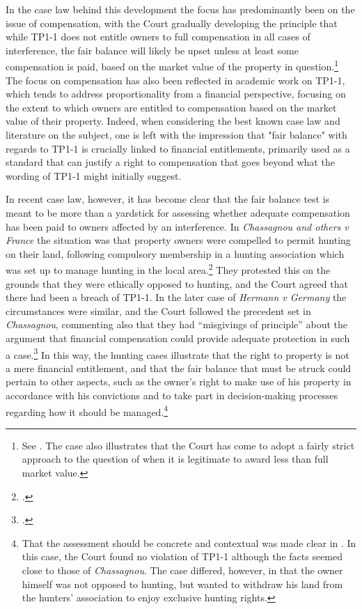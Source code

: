 In the case law behind this development the focus has predominantly been on the issue of compensation, with the Court gradually developing the principle that while TP1-1 does not entitle owners to full compensation in all cases of interference, the fair balance will likely be upset unless at least some compensation is paid, based on the market value of the property in question.\footnote{See \cite[103]{scordino06}. The case also illustrates that the Court has come to adopt a fairly strict approach to the question of when it is legitimate to award less than full market value.} The focus on compensation has also been reflected in academic work on TP1-1, which tends to address proportionality from a financial perspective, focusing on the extent to which owners are entitled to compensation based on the market value of their property. Indeed, when considering the best known case law and literature on the subject, one is left with the impression that "fair balance" with regards to TP1-1 is crucially linked to financial entitlements, primarily used as a standard that can justify a right to compensation that goes beyond what the wording of TP1-1 might initially suggest.

In recent case law, however, it has become clear that the fair balance test is meant to be more than a yardstick for assessing whether adequate compensation has been paid to owners affected by an interference. In {\it Chassagnou and others v France} the situation was that property owners were compelled to permit hunting on their land, following compulsory membership in a hunting association which was set up to manage hunting in the local area.\footcite{chassagnou99} They protested this on the grounds that they were ethically opposed to hunting, and the Court agreed that there had been a breach of TP1-1.  In the later case of {\it Hermann v Germany} the circumstances were similar, and the Court followed the precedent set in {\it Chassagnou}, commenting also that they had ``misgivings of principle'' about the argument that financial compensation could provide adequate protection in such a case.\footcite[See][91]{hermann12}  In this way, the hunting cases illustrate that the right to property is not a mere financial entitlement, and that the fair balance that must be struck could pertain to other aspects, such as the owner's right to make use of his property in accordance with his convictions and to take part in decision-making processes regarding how it should be managed.\footnote{That the assessment should be concrete and contextual was made clear in \cite{chabauty12}. In this case, the Court found no violation of TP1-1 although the facts seemed close to those of {\it Chassagnou}. The case differed, however, in that the owner himself was not opposed to hunting, but wanted to withdraw his land from the hunters' association to enjoy exclusive hunting rights.}


